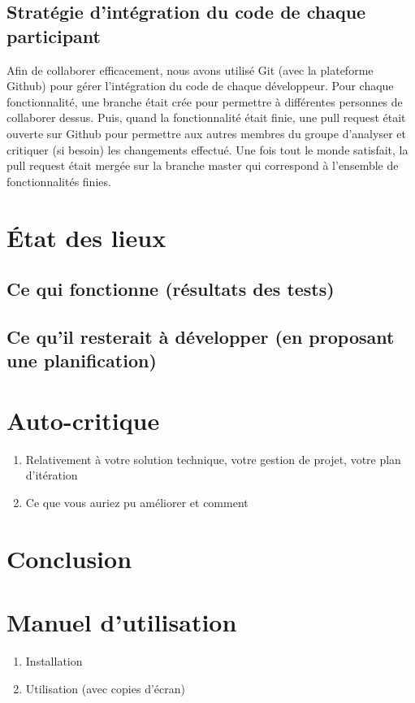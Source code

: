 \documentclass[a4paper,11pt]{article}
\begin{document}
	\subsection{Stratégie d'intégration du code de chaque participant}
	Afin de collaborer efficacement, nous avons utilisé Git (avec la plateforme Github) pour gérer l'intégration du code de chaque développeur. Pour chaque fonctionnalité, une branche était crée pour permettre à différentes personnes de collaborer dessus. Puis, quand la fonctionnalité était finie, une pull request était ouverte sur Github pour permettre aux autres membres du groupe d'analyser et critiquer (si besoin) les changements effectué. Une fois tout le monde satisfait, la pull request était mergée sur la branche master qui correspond à l'ensemble de fonctionnalités finies.

	\section{État des lieux}
	
	
	\subsection{Ce qui fonctionne (résultats des tests)}
	
	
	\subsection{Ce qu'il resterait à développer (en proposant une planification)}
	
	
	\section{Auto-critique}
	
	
	\begin{enumerate}
		\item Relativement à votre solution technique, votre gestion de projet, votre plan d'itération
		\item Ce que vous auriez pu améliorer et comment
	\end{enumerate}


	\section{Conclusion}
	
	
	\appendix
	\section{Manuel d'utilisation} \label{app:manuelUtil}
	\begin{enumerate}
		\item Installation
		\item Utilisation (avec copies d'écran)
	\end{enumerate}
\end{document}
